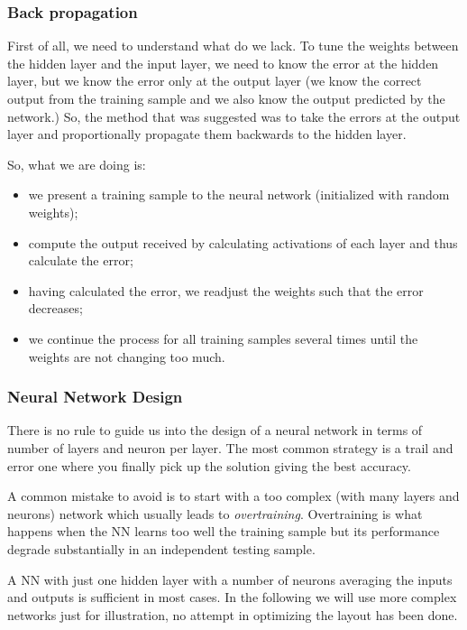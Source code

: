 \documentclass[11pt]{article}
\providecommand{\tightlist}{%
      \setlength{\itemsep}{0pt}\setlength{\parskip}{0pt}}
\begin{document}
\hypertarget{back-propagation}{%
\subsubsection{Back propagation}\label{back-propagation}}

First of all, we need to understand what do we lack. To tune the weights
between the hidden layer and the input layer, we need to know the error
at the hidden layer, but we know the error only at the output layer (we
know the correct output from the training sample and we also know the
output predicted by the network.) So, the method that was suggested was
to take the errors at the output layer and proportionally propagate them
backwards to the hidden layer.

So, what we are doing is:

\begin{itemize}
\tightlist
\item
  we present a training sample to the neural network (initialized with
  random weights);
\item
  compute the output received by calculating activations of each layer
  and thus calculate the error;
\item
  having calculated the error, we readjust the weights such that the
  error decreases;
\item
  we continue the process for all training samples several times until
  the weights are not changing too much.
\end{itemize}

\subsubsection{Neural Network Design}

There is no rule to guide us into the design of a neural network in terms
of number of layers and neuron per layer. The most common strategy is a
trail and error one where you finally pick up the solution giving the best accuracy.

A common mistake to avoid is to start with a too complex
(with many layers and neurons) network which usually leads to \emph{overtraining}.
Overtraining is what happens when the NN learns too well the training sample
but its performance degrade substantially in an independent testing sample.

A NN with just one hidden layer with a number of neurons averaging the inputs
and outputs is sufficient in most cases. In the following we will use more
complex networks just for illustration, no attempt in optimizing the layout has been done.
\end{document}
